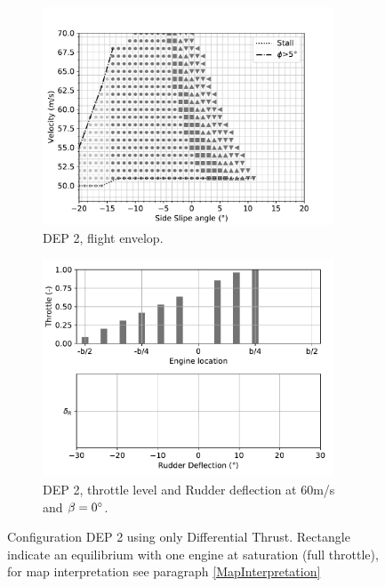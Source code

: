 \begin{figure}[hbt]
		\centering
		\begin{subfigure}{0.49\textwidth}
			\includegraphics[width=0.95\textwidth]{DEPoriginalMapBetaVelfin1Eng15RudTrue}
			\caption{DEP 2, flight envelop.}
			\label{fig:DEPoriginalfin1_15engine}
		\end{subfigure}
		\begin{subfigure}{0.49\textwidth}
			\includegraphics[width=0.95\textwidth]{DeflDEPoriginalfin1Eng15RudTrue}
			\caption{DEP 2, throttle level and Rudder deflection at 60m/s and $\beta=0\degree$.}
			\label{fig:DeflDEPoriginalfin1_15Eng}
		\end{subfigure}
		\caption{Configuration DEP 2 using only Differential Thrust. Rectangle indicate an equilibrium with one engine at saturation (full throttle), for map interpretation see paragraph \ref{MapInterpretation}}\label{DEPfin1_15engMap+Defl}
\end{figure}

